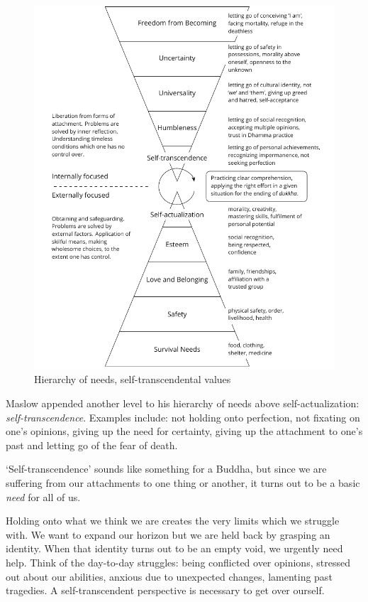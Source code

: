 \begin{figure}[h]
\caption{Hierarchy of needs, self-transcendental values}\label{fig-self-transcendental}
\bigskip
\includegraphics[width=\linewidth]{./manuscript/tex/diagrams/self-transcendental-values.pdf}
\end{figure}

\clearpage
\normalpagelayout

Maslow appended another level to his hierarchy of needs above
self-actualization: \emph{self-transcendence}. Examples include: not
holding onto perfection, not fixating on one's opinions, giving up the
need for certainty, giving up the attachment to one's past and letting
go of the fear of death.

`Self-transcendence' sounds like something for a Buddha, but since we
are suffering from our attachments to one thing or another, it turns out
to be a basic \emph{need} for all of us.

Holding onto what we think we are creates the very limits which we
struggle with. We want to expand our horizon but we are held back by
grasping an identity. When that identity turns out to be an empty void,
we urgently need help. Think of the day-to-day struggles: being
conflicted over opinions, stressed out about our abilities, anxious due
to unexpected changes, lamenting past tragedies. A self-transcendent
perspective is necessary to get over ourself.

